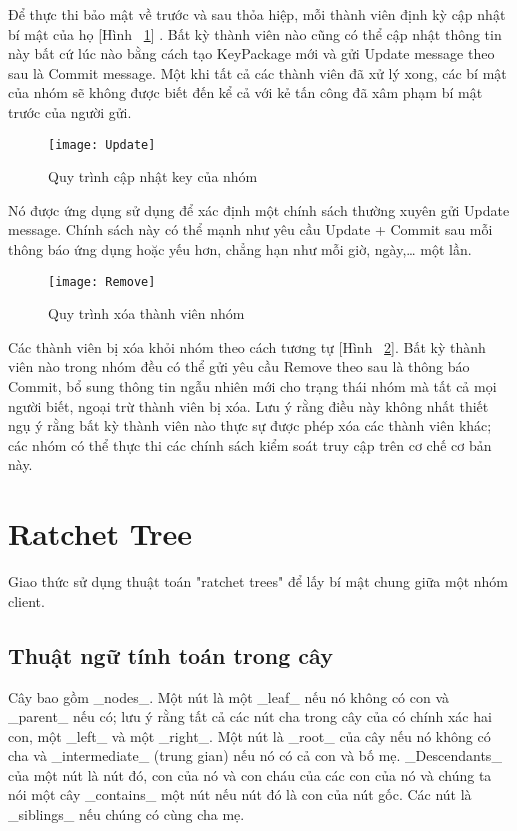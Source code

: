 \documentclass[../main-report.tex]{subfiles}
\begin{document}
Để thực thi bảo mật về trước và sau thỏa hiệp, mỗi thành viên định kỳ cập nhật bí mật của họ [Hình ~\ref{fig:update}] . Bất kỳ thành viên nào cũng có thể cập nhật thông tin này bất cứ lúc nào bằng cách tạo KeyPackage mới và gửi Update message theo sau là Commit message. Một khi tất cả các thành viên đã xử lý xong, các bí mật của nhóm sẽ không được biết đến kể cả với kẻ tấn công đã xâm phạm bí mật trước của người gửi. 

\begin{figure}[!h]
\begin{center}
\label{fig:update}
\texttt{[image: Update]}
\caption{Quy trình cập nhật key của nhóm}
\end{center}
\end{figure}

Nó được ứng dụng sử dụng để xác định một chính sách thường xuyên gửi Update message. Chính sách này có thể mạnh như yêu cầu Update + Commit sau mỗi thông báo ứng dụng hoặc yếu hơn, chẳng hạn như mỗi giờ, ngày,… một lần. 

\begin{figure}[!h]
\begin{center}
\label{fig:remove}
\texttt{[image: Remove]}
\caption{Quy trình xóa thành viên nhóm}
\end{center}
\end{figure}

Các thành viên bị xóa khỏi nhóm theo cách tương tự [Hình ~\ref{fig:remove}]. Bất kỳ thành viên nào trong nhóm đều có thể gửi yêu cầu Remove theo sau là thông báo Commit, bổ sung thông tin ngẫu nhiên mới cho trạng thái nhóm mà tất cả mọi người biết, ngoại trừ thành viên bị xóa. Lưu ý rằng điều này không nhất thiết ngụ ý rằng bất kỳ thành viên nào thực sự được phép xóa các thành viên khác; các nhóm có thể thực thi các chính sách kiểm soát truy cập trên cơ chế cơ bản này.



\section{Ratchet Tree}
Giao thức sử dụng thuật toán "ratchet trees" để lấy bí mật chung giữa một nhóm client.

\subsection{Thuật ngữ tính toán trong cây}
Cây bao gồm \_nodes\_. Một nút là một \_leaf\_ nếu nó không có con và \_parent\_ nếu có; lưu ý rằng tất cả các nút cha trong cây của có chính xác hai con, một \_left\_ và một \_right\_. Một nút là \_root\_ của cây nếu nó không có cha và \_intermediate\_ (trung gian) nếu nó có cả con và bố mẹ. \_Descendants\_ của một nút là nút đó, con của nó và con cháu của các con của nó và chúng ta nói một cây \_contains\_ một nút nếu nút đó là con của nút gốc. Các nút là \_siblings\_ nếu chúng có cùng cha mẹ.
\end{document}
